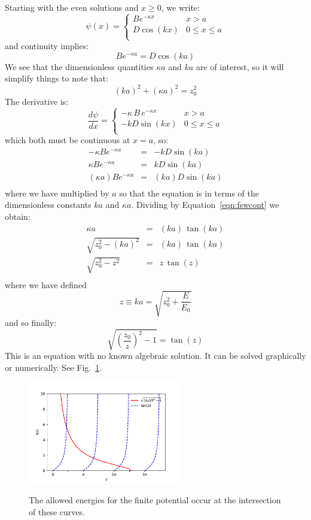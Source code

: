 \documentclass[12pt]{book}
\begin{document}
Starting with the even solutions and $x\geq0$, we write:
$$\psi(x) = \begin{cases}
Be^{\displaystyle -\kappa x} & x > a \\
D \cos(kx) & 0 \leq x \leq a \\
\end{cases}$$
and continuity implies:
\begin{equation}
\label{eqn:fswcont}
B e^{-\kappa a} = D \cos(ka)
\end{equation}
We see that the dimensionless quantities $\kappa a$ and $ka$ are of interest, so it will simplify things to note that:
$$(ka)^2+(\kappa a)^2 = z_0^2$$
The derivative is:
$$\frac{d\psi}{dx} = \begin{cases}
-\kappa \, B \, e^{\displaystyle -\kappa x} & x > a \\
-kD \sin(kx) & 0 \leq x \leq a \\
\end{cases}$$
which both must be continuous at $x=a$, so:
\begin{eqnarray*}
-\kappa B e^{-\kappa a} &=& -k D \sin(ka)\\
 \kappa B e^{-\kappa a} &=& k D \sin(ka)\\
 (\kappa a) B e^{-\kappa a} &=& (ka) D \sin(ka)\\
\end{eqnarray*}
where we have multiplied by $a$ so that the equation is in terms of the dimensionless constants $ka$ and $\kappa a$.  Dividing by Equation~\ref{eqn:fswcont} we obtain:
\begin{eqnarray*}
\kappa a &=& (ka) \, \tan(ka) \\
\sqrt{z_0^2-(ka)^2} &=& (ka) \, \tan(ka) \\
\sqrt{z_0^2-z^2} &=& z \, \tan(z) \\
\end{eqnarray*}
where we have defined 
$$z \equiv ka = \sqrt{z_0^2 + \frac{E}{E_0}}$$
and so finally:
\begin{equation}
\sqrt{\left(\frac{z_0}{z}\right)^2-1} = \tan(z) 
\end{equation}
This is an equation with no known algebraic solution.  It can be solved graphically or numerically.  See Fig.~\ref{fig:finitewell}.
\begin{figure}[thb]
\begin{center}
{\includegraphics[width=0.60\textwidth]{plots/finitewell.pdf}}
\end{center}
\caption{\label{fig:finitewell} The allowed energies for the finite potential occur at the intersection of these curves.}
\end{figure}
\end{document}
